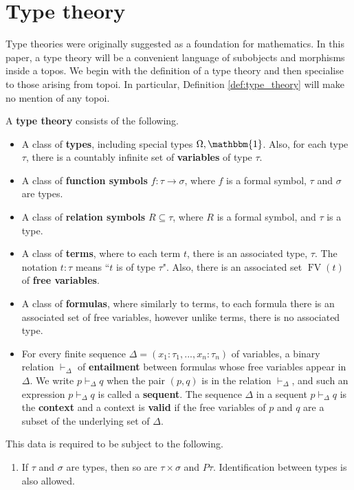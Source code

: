 \documentclass{tac}
\begin{document}
	\section{Type theory}\label{sec:type_theory}
	Type theories were originally suggested as a foundation for mathematics. In this paper, a type theory will be a convenient language of subobjects and morphisms inside a topos. We begin with the definition of a type theory and then specialise to those arising from topoi. In particular, Definition \ref{def:type_theory} will make no mention of any topoi.
	\begin{definition}
		\label{def:type_theory}
		A \textbf{type theory} consists of the following.
		\begin{itemize}
			\item A class of \textbf{types}, including special types $\Omega, \mathbbm{1}$. Also, for each type $\tau$, there is a countably infinite set of \textbf{variables} of type $\tau$.
			\item A class of \textbf{function symbols} $f: \tau \to \sigma$, where $f$ is a formal symbol, $\tau$ and $\sigma$ are types.
			\item A class of \textbf{relation symbols} $R \subseteq \tau$, where $R$ is a formal symbol, and $\tau$ is a type.
			\item A class of \textbf{terms}, where to each term $t$, there is an associated type, $\tau$. The notation $t : \tau$ means ``$t$ is of type $\tau$". Also, there is an associated set $\operatorname{FV}(t)$ of \textbf{free variables}.
			\item A class of \textbf{formulas}, where similarly to terms, to each formula there is an associated set of free variables, however unlike terms, there is no associated type.
			\item For every finite sequence $\Delta = (x_1:\tau_1,...,x_n:\tau_n)$ of variables, a binary relation $\vdash_\Delta$ of \textbf{entailment} between formulas whose free variables appear in $\Delta$. We write $p \vdash_\Delta q$ when the pair $(p,q)$ is in the relation $\vdash_\Delta$, and such an expression $p \vdash_\Delta q$ is called a \textbf{sequent}. The sequence $\Delta$ in a sequent $p \vdash_\Delta q$ is the \textbf{context} and a context is \textbf{valid} if the free variables of $p$ and $q$ are a subset of the underlying set of $\Delta$.
		\end{itemize}
		This data is required to be subject to the following.
		\begin{enumerate}
			\item If $\tau$ and $\sigma$ are types, then so are $\tau \times \sigma$ and $P\tau$. Identification between types is also allowed.\\\\

\end{enumerate}
\end{definition}
\end{document}
